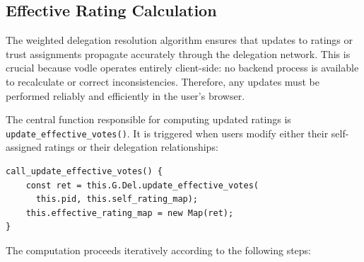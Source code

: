 \subsection{Effective Rating Calculation}

The weighted delegation resolution algorithm ensures that updates to ratings or trust assignments propagate accurately through the delegation network. This is crucial because vodle operates entirely client-side: no backend process is available to recalculate or correct inconsistencies. Therefore, any updates must be performed reliably and efficiently in the user's browser.

The central function responsible for computing updated ratings is \texttt{update\_effective\_votes()}. It is triggered when users modify either their self-assigned ratings or their delegation relationships:

\begin{verbatim}
call_update_effective_votes() {
    const ret = this.G.Del.update_effective_votes(
      this.pid, this.self_rating_map);
    this.effective_rating_map = new Map(ret);
}
\end{verbatim}

The computation proceeds iteratively according to the following steps:

